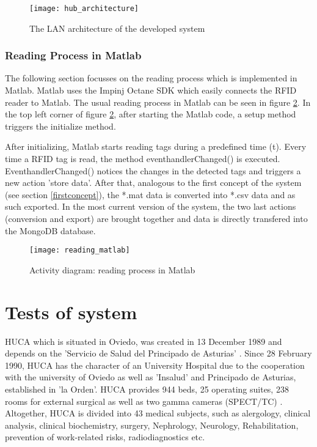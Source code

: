 \begin{figure}
\centering
\texttt{[image: hub\_architecture]} 
\caption{\label{fig:hub_architecture}The LAN architecture of the developed system} 
\end{figure}

\subsubsection{Reading Process in Matlab}

The following section focusses on the reading process which is implemented in Matlab. Matlab uses the Impinj Octane SDK \cite{octanesdk} which easily connects the RFID reader to Matlab. The usual reading process in Matlab can be seen in figure \ref{fig:reading_matlab}. In the top left corner of figure \ref{fig:reading_matlab}, after starting the Matlab code, a setup method triggers the initialize method. 

After initializing, Matlab starts reading tags during a predefined time (t). Every time a RFID tag is read, the method eventhandlerChanged() is executed. EventhandlerChanged() notices the changes in the detected tags and triggers a new action 'store data'. After that, analogous to the first concept of the system (see section \ref{firstconcept}), the *.mat data is converted into *.csv data and as such exported. In the most current version of the system, the two last actions (conversion and export) are brought together and data is directly transfered into the MongoDB database. 

\begin{figure}
\centering
\texttt{[image: reading\_matlab]} 
\caption{\label{fig:reading_matlab}Activity diagram: reading process in Matlab} 
\end{figure}

\section{Tests of system}\label{tests}

\ac{HUCA} which is situated in Oviedo, was created in 13 December 1989 and depends on the 'Servicio de Salud del Principado de Asturias' \cite{huca}. Since 28 February 1990, HUCA has the character of an University Hospital due to the cooperation with the university of Oviedo as well as 'Insalud' and Principado de Asturias, established in 'la Orden'. 
HUCA provides 944 beds, 25 operating suites, 238 rooms for external surgical as well as two gamma cameras (\ac{SPECT}/\ac{TC}) \cite{huca}. Altogether, HUCA is divided into 43 medical subjects, such as alergology, clinical analysis, clinical biochemistry, surgery, Nephrology, Neurology, Rehabilitation, prevention of work-related risks, radiodiagnostics etc. 

